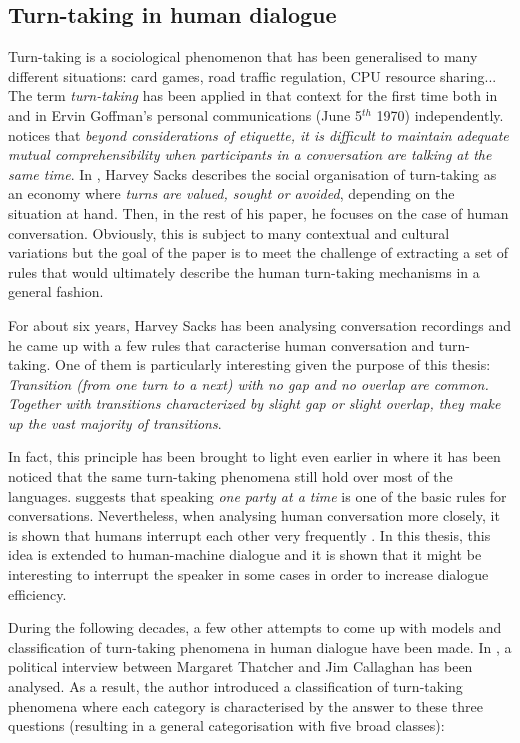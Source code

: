     \subsection{Turn-taking in human dialogue}
    \label{soa:ttphuman}
    
    Turn-taking is a sociological phenomenon that has been generalised to many different situations: card games, road traffic regulation, CPU resource sharing... The term \textit{turn-taking} has been applied in that context for the first time both in \cite{Yngve1970} and in Ervin Goffman's personal communications (June 5$^{th}$ 1970) independently. \cite{Duncan1972} notices that \textit{beyond considerations of etiquette, it is difficult to maintain adequate mutual comprehensibility when participants in a conversation are talking at the same time}. In \cite{Sacks1974}, Harvey Sacks describes the social organisation of turn-taking as an economy where \textit{turns are valued, sought or avoided}, depending on the situation at hand. Then, in the rest of his paper, he focuses on the case of human conversation. Obviously, this is subject to many contextual and cultural variations but the goal of the paper is to meet the challenge of extracting a set of rules that would ultimately describe the human turn-taking mechanisms in a general fashion.
        
        For about six years, Harvey Sacks has been analysing conversation recordings and he came up with a few rules that caracterise human conversation and turn-taking. One of them is particularly interesting given the purpose of this thesis: \textit{Transition (from one turn to a next) with no gap and no overlap are common. Together with transitions characterized by slight gap or slight overlap, they make up the vast majority of transitions}.
        
        In fact, this principle has been brought to light even earlier in \cite{Sullivan1947} where it has been noticed that the same turn-taking phenomena still hold over most of the languages. \citet{Schegloff1968} suggests that speaking \textit{one party at a time} is one of the basic rules for conversations. Nevertheless, when analysing human conversation more closely, it is shown that humans interrupt each other very frequently \cite{Beattie1982,Strombergsson2013}. In this thesis, this idea is extended to human-machine dialogue and it is shown that it might be interesting to interrupt the speaker in some cases in order to increase dialogue efficiency.
        
        During the following decades, a few other attempts to come up with models and classification of turn-taking phenomena in human dialogue have been made. In \cite{Beattie1982}, a political interview between Margaret Thatcher and Jim Callaghan has been analysed. As a result, the author introduced a classification of turn-taking phenomena where each category is characterised by the answer to these three questions (resulting in a general categorisation with five broad classes):
        
